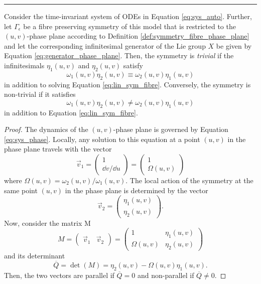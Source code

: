 \hrule
\begin{theorem}
  Consider the time-invariant system of ODEs in Equation \eqref{eq:sys_auto}. Further, let $\Gamma_\epsilon$ be a fibre preserving symmetry of this model that is restricted to the $(u,v)$-phase plane according to Definition \ref{def:symmetry_fibre_phase_plane} and let the corresponding infinitesimal generator of the Lie group $X$ be given by Equation \eqref{eq:generator_phase_plane}. Then, the symmetry is \textit{trivial} if the infinitesimals $\eta_1(u,v)$ and $\eta_2(u,v)$ satisfy
  \begin{equation}
    \omega_1(u,v)\eta_2(u,v)\equiv\omega_2(u,v)\eta_1(u,v)
    \label{eq:trivial_symmetry}
    \end{equation}
    in addition to solving Equation \eqref{eq:lin_sym_fibre}. Conversely, the symmetry is non-trivial if it satisfies
  \begin{equation}
    \omega_1(u,v)\eta_2(u,v)\neq\omega_2(u,v)\eta_1(u,v)
    \label{eq:nontrivial_symmetry}
    \end{equation}    
in addition to Equation \eqref{eq:lin_sym_fibre}.
\label{thm:trivial_and_nontrivial}
\end{theorem}
  \dotfill
\begin{proof}
  The dynamics of the $(u,v)$-phase plane is governed by Equation \eqref{eq:sys_phase}. Locally, any solution to this equation at a point $(u,v)$ in the phase plane travels with the vector
  $$\vec{v}_1=\begin{pmatrix}1 \\ \dd v/\dd u\end{pmatrix}=\begin{pmatrix}1 \\ \Omega(u,v)\end{pmatrix}$$
  where $\Omega(u,v)=\omega_2(u,v)/\omega_1(u,v)$. The local action of the symmetry at the same point $(u,v)$ in the phase plane is determined by the vector
  $$\vec{v}_2=\begin{pmatrix}\eta_1(u,v) \\ \eta_2(u,v)\end{pmatrix}.$$
  Now, consider the matrix M
  $$M=\begin{pmatrix}\vec{v}_1&\vec{v}_2\end{pmatrix}=\begin{pmatrix}1&\eta_1(u,v)\\\Omega(u,v)&\eta_2(u,v)\end{pmatrix}$$
and its determinant
  \begin{equation}
    \overline{Q}=\det\left(M\right)=\eta_2(u,v)-\Omega(u,v)\eta_1(u,v).
    \label{eq:characteristic}
    \end{equation}
  Then, the two vectors are parallel if $\overline{Q}=0$ and non-parallel if $\overline{Q}\neq 0$.
  
\end{proof}
